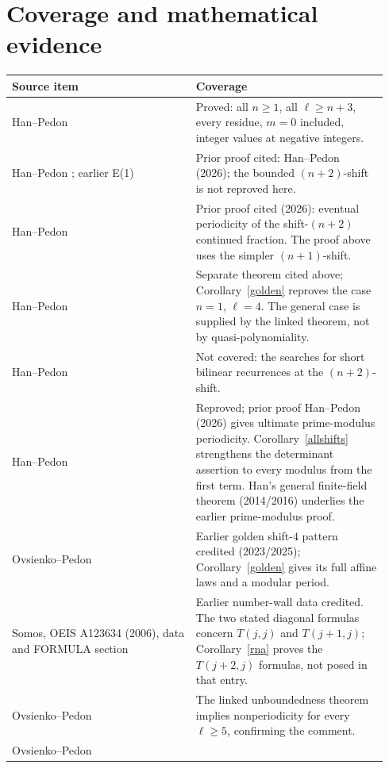 \documentclass[11pt,a4paper]{article}
\begin{document}
\section{Coverage and mathematical evidence}
\begingroup\small
\begin{longtable}{@{}p{0.46\linewidth}p{0.48\linewidth}@{}}\toprule
Source item & Coverage\\\midrule
Han--Pedon \cite[p.~6, Conjecture C]{HPplus}
 & Proved: all $n\ge1$, all $\ell\ge n+3$, every residue, $m=0$
 included, integer values at negative integers.\\
Han--Pedon \cite[p.~5, Theorem B]{HPplus}; earlier E(1) \cite{HP}
 & Prior proof cited: Han--Pedon (2026); the bounded $(n+2)$-shift is
 not reproved here.\\
Han--Pedon \cite[Theorem A]{HPplus}
 & Prior proof cited (2026): eventual periodicity of the shift-$(n+2)$
 continued fraction. The proof above uses the simpler $(n+1)$-shift.\\
Han--Pedon \cite[p.~9, Conjecture E(2)]{HP}
 & Separate theorem cited above; Corollary~\ref{golden} reproves
 the case $n=1$, $\ell=4$. The general case is supplied by the linked
 theorem, not by quasi-polynomiality.\\
Han--Pedon \cite[pp.~5--6, paragraphs following Theorem B]{HPplus}
 & Not covered: the searches for short bilinear recurrences at the
 $(n+2)$-shift.\\
Han--Pedon \cite[p.~9, Theorem F]{HP}
 & Reproved; prior proof Han--Pedon (2026) gives ultimate
 prime-modulus periodicity. Corollary~\ref{allshifts} strengthens the
 determinant assertion to every modulus from the first term.
 Han's general finite-field theorem (2014/2016) \cite[Theorem~1.1]{Han}
 underlies the earlier prime-modulus proof.\\
Ovsienko--Pedon \cite[p.~8, (1.18)]{OP}
 & Earlier golden shift-$4$ pattern credited (2023/2025);
 Corollary~\ref{golden} gives its full affine laws and a modular period.\\
Somos, OEIS A123634 (2006), data and FORMULA section \cite{OEISwall}
 & Earlier number-wall data credited. The two stated diagonal formulas
 concern $T(j,j)$ and $T(j+1,j)$; Corollary~\ref{rna} proves the
 $T(j+2,j)$ formulas, not posed in that entry.\\
Ovsienko--Pedon \cite[p.~9, silver aperiodicity comment]{OP}
 & The linked unboundedness theorem implies nonperiodicity for every
 $\ell\ge5$, confirming the comment.\\
Ovsienko--Pedon \cite[Conjecture 1.9(a),(b)]{OP}

\end{longtable}
\end{document}
